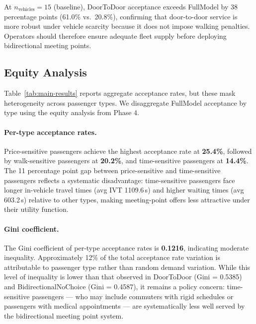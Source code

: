 At $n_{\text{vehicles}} = 15$ (baseline), DoorToDoor acceptance exceeds
FullModel by 38 percentage points (61.0\% vs.\ 20.8\%), confirming that
door-to-door service is more robust under vehicle scarcity because it does
not impose walking penalties. Operators should therefore ensure adequate
fleet supply before deploying bidirectional meeting points.

\subsection{Equity Analysis}

Table~\ref{tab:main-results} reports aggregate acceptance rates, but these
mask heterogeneity across passenger types. We disaggregate FullModel
acceptance by type using the equity analysis from Phase 4.

\paragraph{Per-type acceptance rates.}
Price-sensitive passengers achieve the highest acceptance rate at
\textbf{25.4\%}, followed by walk-sensitive passengers at \textbf{20.2\%},
and time-sensitive passengers at \textbf{14.4\%}. The 11 percentage point
gap between price-sensitive and time-sensitive passengers reflects a
systematic disadvantage: time-sensitive passengers face longer in-vehicle
travel times (avg IVT 1109.6\,s) and higher waiting times (avg 603.2\,s)
relative to other types, making meeting-point offers less attractive under
their utility function.

\paragraph{Gini coefficient.}
The Gini coefficient of per-type acceptance rates is \textbf{0.1216},
indicating moderate inequality. Approximately 12\% of the total acceptance
rate variation is attributable to passenger type rather than random demand
variation. While this level of inequality is lower than that observed in
DoorToDoor (Gini = 0.5385) and BidirectionalNoChoice (Gini = 0.4587), it
remains a policy concern: time-sensitive passengers --- who may include
commuters with rigid schedules or passengers with medical appointments ---
are systematically less well served by the bidirectional meeting point system.

